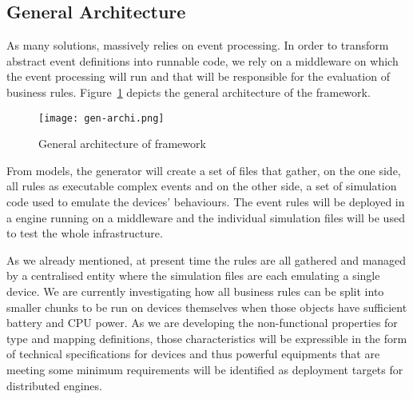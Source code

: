 \subsection{General Architecture}
\label{sec:CG-Architecture}

As many \IOT solutions, \IOTDSL massively relies on event processing. In order to transform abstract event definitions into runnable code, we rely on a middleware on which the event processing will run and that will be responsible for the evaluation of business rules. Figure~\ref{fig:gen-archi} depicts the general architecture of the \IOTDSL framework.

\begin{figure}%
	\centering  
	\texttt{[image: gen-archi.png]}%
	\caption{General architecture of \IOTDSL framework}%
	\label{fig:gen-archi}%
\end{figure}

From \IOTDSL models, the generator will create a set of files that gather, on the one side, all rules as executable complex events and on the other side, a set of simulation code used to emulate the devices' behaviours. The event rules will be deployed in a \CEP engine running on a middleware and the individual simulation files will be used to test the whole infrastructure.

As we already mentioned, at present time the rules are all gathered and managed by a centralised entity where the simulation files are each emulating a single device. We are currently investigating how all business rules can be split into smaller chunks to be run on devices themselves when those objects have sufficient battery and CPU power. As we are developing the non-functional properties for \IOTDSL type and mapping definitions, those characteristics will be expressible in the form of technical specifications for devices and thus powerful equipments that are meeting some minimum requirements will be identified as deployment targets for distributed \CEP engines. 